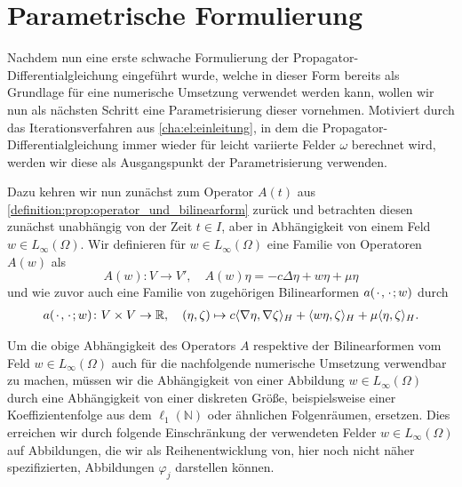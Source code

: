 

\section{Parametrische Formulierung} %
\label{sec:ps:pf:parametrische_formulierung}

Nachdem nun eine erste schwache Formulierung der Propagator-Differentialgleichung eingeführt wurde, welche in dieser Form bereits als Grundlage für eine numerische Umsetzung verwendet werden kann, wollen wir nun als nächsten Schritt eine Parametrisierung dieser vornehmen.
Motiviert durch das Iterationsverfahren aus \cref{cha:el:einleitung}, in dem die Propagator-Differentialgleichung immer wieder für leicht variierte Felder $\omega$ berechnet wird, werden wir diese als Ausgangspunkt der Parametrisierung verwenden.

Dazu kehren wir nun zunächst zum Operator $A(t)$ aus \cref{definition:prop:operator_und_bilinearform} zurück und betrachten diesen zunächst unabhängig von der Zeit $t \in I$, aber in Abhängigkeit von einem Feld $w \in L_{\infty}(\Omega)$.
Wir definieren für $w \in L_{\infty}(\Omega)$ eine Familie von Operatoren $A(w)$ als
\begin{equation}
    \label{eq:ps:pf:operator_A}
    A(w) \colon V \to V', \quad A(w) \eta = - c \Delta \eta + w \eta + \mu \eta
\end{equation}
und wie zuvor auch eine Familie von zugehörigen Bilinearformen $a({\mkern2mu\cdot\mkern2mu}, {\mkern2mu\cdot\mkern2mu}; w)$ durch
\begin{equation}
    \label{eq:ps:pf:bilinearform_a}
    \begin{aligned}
        a({\mkern2mu\cdot\mkern2mu}, {\mkern2mu\cdot\mkern2mu}; w) \colon V \times V \to \mathbb{R}, \quad
        (\eta, \zeta) \mapsto c\langle\nabla \eta,\nabla \zeta\rangle_{H} + \langle w \eta,\zeta\rangle_{H} + \mu \langle\eta,\zeta\rangle_{H}.
    \end{aligned}
\end{equation}

Um die obige Abhängigkeit des Operators $A$ respektive der Bilinearformen vom Feld $w \in L_{\infty}(\Omega)$ auch für die nachfolgende numerische Umsetzung verwendbar zu machen, müssen wir die Abhängigkeit von einer Abbildung $w \in L_{\infty}(\Omega)$ durch eine Abhängigkeit von einer diskreten Größe, beispielsweise einer Koeffizientenfolge aus dem $\ell_{1}(\mathbb{N})$ oder ähnlichen Folgenräumen, ersetzen.
Dies erreichen wir durch folgende Einschränkung der verwendeten Felder $w \in L_{\infty}(\Omega)$ auf Abbildungen, die wir als Reihenentwicklung von, hier noch nicht näher spezifizierten,  Abbildungen $\varphi_{j}$ darstellen können.

